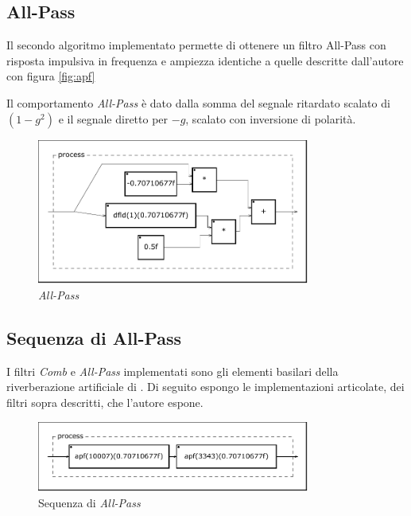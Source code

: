 \subsection{All-Pass}

Il secondo algoritmo implementato permette di ottenere un filtro All-Pass
con risposta impulsiva in frequenza e ampiezza identiche a quelle descritte
dall'autore con figura \ref{fig:apf}



Il comportamento \emph{All-Pass} è dato dalla somma del segnale ritardato
scalato di $(1-g^2)$ e il segnale diretto per $-g$, scalato con inversione di
polarità.

\begin{figure}[htp]
\centering
\includegraphics[width=0.80\textwidth]{Code/msapf-svg/process.pdf}
\caption{\emph{All-Pass}}
\label{fig:apfaust}
\end{figure}

\subsection{Sequenza di All-Pass}

I filtri \emph{Comb} e \emph{All-Pass} implementati sono gli elementi basilari
della riverberazione artificiale di \ms. Di seguito espongo le implementazioni
articolate, dei filtri sopra descritti, che l'autore espone.



\begin{figure}[htp]
\centering
\includegraphics[width=0.80\textwidth]{Code/msapfseq-svg/process.pdf}
\caption{Sequenza di \emph{All-Pass}}
\label{fig:apfseq}
\end{figure}

